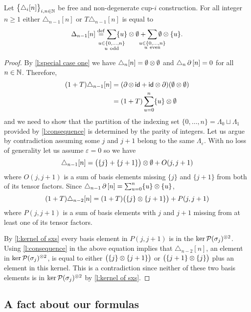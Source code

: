 \begin{lemma} \label{l:special case two}
	Let $\big\{ \triangle_i [n] \big\}_{i,n\in\mathbb{N}}$ be free and non-degenerate \mbox{cup-$i$} construction.
	For all integer $n \geq 1$ either $\triangle_{n-1} [n]$ or $T \triangle_{n-1} [n]$ is equal to
	\[
	\Delta_{n-1} [n] \defeq
	\sum_{\mathclap{\substack{u \in \{0,\dots,n\} \\ u \ \mathrm{odd}}}} \{u\} \ot \emptyset +
	\sum_{\mathclap{\substack{u \in \{0,\dots,n\} \\ u \ \mathrm{even}}}} \emptyset \ot \{u\}.
	\]
\end{lemma}

\begin{proof}
	By \cref{l:special case one} we have $\triangle_{n} [n] = \emptyset \otimes \emptyset$ and $\triangle_{n} \operatorname{\partial} \, [n] = 0$ for all $n \in \mathbb{N}$.
	Therefore,
	\begin{align*}
	(1+T) \triangle_{n-1} [n] &=
	(\operatorname{\partial} \otimes \, \mathsf{id} + \mathsf{id} \otimes \operatorname{\partial}) (\emptyset \otimes \emptyset) \\ &=
	(1+T) \sum_{u=0}^n \{u\} \otimes \emptyset
	\end{align*}
	and we need to show that the partition of the indexing set $\{0, \dots, n\} = \Lambda_0 \sqcup \Lambda_1$ provided by \cref{l:consequence} is determined by the parity of integers.
	Let us argue by contradiction assuming some $j$ and $j+1$ belong to the same $\Lambda_{\varepsilon}$.
	With no loss of generality let us assume $\varepsilon = 0$ so we have
	\[
	\triangle_{n-1} [n] = \big( \{j\} + \{j+1\} \big) \otimes \emptyset + O(j, j+1)
	\]
	where $O(j, j+1)$ is a sum of basis elements missing $\{j\}$ and $\{j+1\}$ from both of its tensor factors.
	Since $\triangle_{n-1} \operatorname{\partial} \, [n] = \sum_{u=0}^{n} \{u\} \otimes \{u\}$,
	\[
	(1+T) \triangle_{n-2} [n] = (1+T) \big( \{j\} \otimes \{j+1\} \big) + P(j, j+1)
	\]
	where $P(j, j+1)$ is a sum of basis elements with $j$ and $j+1$ missing from at least one of its tensor factors.

	By \cref{l:kernel of sxs} every basis element in $P(j,j+1)$ is in the $\ker \mathcal{P}(\sigma_j)^{\otimes 2}$.
	Using \cref{l:consequence} in the above equation implies that $\triangle_{n-2} [n]$, an element in $\ker \mathcal{P}(\sigma_j)^{\otimes 2}$, is equal to either $\big( \{j\} \otimes \{j+1\} \big)$ or $\big( \{j+1\} \otimes \{j\} \big)$ plus an element in this kernel.
	This is a contradiction since neither of these two basis elements is in $\ker \mathcal{P}(\sigma_j)^{\otimes 2}$ by \cref{l:kernel of sxs}.
\end{proof}

\subsection{A fact about our formulas} \label{ss:fact}

